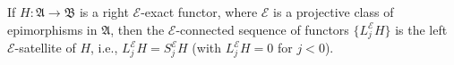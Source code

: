 If $H : \mathfrak{A} \to \mathfrak{B}$ is a right $\mathcal{E}$-exact functor, where $\mathcal{E}$ is a projective class of epimorphisms in $\mathfrak{A}$, then the $\mathcal{E}$-connected sequence of functors $\{L_j^{\mathcal{E}} H\}$ is the left $\mathcal{E}$-satellite of $H$, i.e., $L_j^{\mathcal{E}} H = S_j^{\mathcal{E}} H$ (with $L_j^{\mathcal{E}} H = 0$ for $j < 0$).